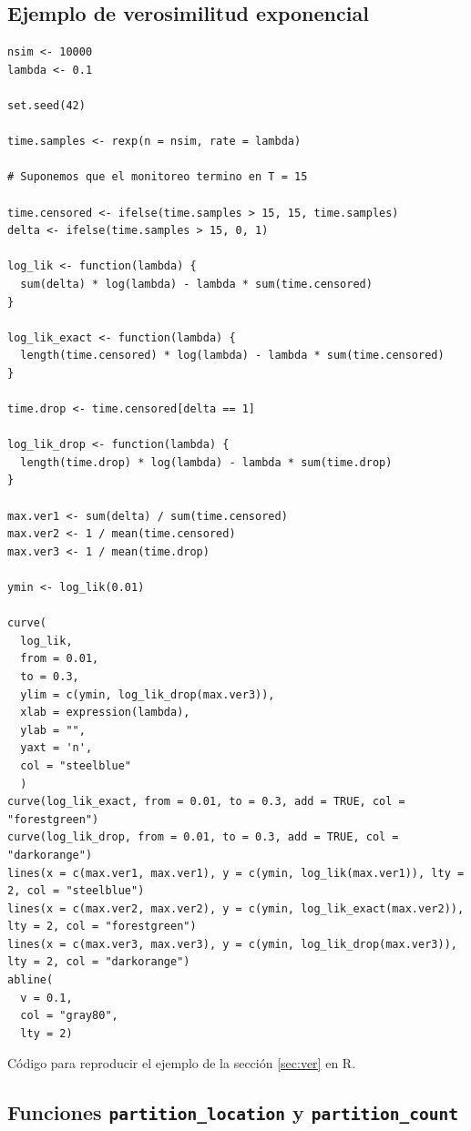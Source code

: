 \documentclass[11pt,a4paper]{article}
\begin{document}
\begin{appendices}
\subsection{Ejemplo de verosimilitud exponencial}
\label{ap:lik}

\begin{table}[!htb]
\begin{lstlisting}
nsim <- 10000
lambda <- 0.1

set.seed(42)

time.samples <- rexp(n = nsim, rate = lambda)

# Suponemos que el monitoreo termino en T = 15

time.censored <- ifelse(time.samples > 15, 15, time.samples)
delta <- ifelse(time.samples > 15, 0, 1)

log_lik <- function(lambda) {
  sum(delta) * log(lambda) - lambda * sum(time.censored)
}

log_lik_exact <- function(lambda) {
  length(time.censored) * log(lambda) - lambda * sum(time.censored)
}

time.drop <- time.censored[delta == 1]

log_lik_drop <- function(lambda) {
  length(time.drop) * log(lambda) - lambda * sum(time.drop)
}

max.ver1 <- sum(delta) / sum(time.censored)
max.ver2 <- 1 / mean(time.censored)
max.ver3 <- 1 / mean(time.drop)

ymin <- log_lik(0.01)

curve(
  log_lik,
  from = 0.01,
  to = 0.3,
  ylim = c(ymin, log_lik_drop(max.ver3)),
  xlab = expression(lambda),
  ylab = "",
  yaxt = 'n',
  col = "steelblue"
  )
curve(log_lik_exact, from = 0.01, to = 0.3, add = TRUE, col = "forestgreen")
curve(log_lik_drop, from = 0.01, to = 0.3, add = TRUE, col = "darkorange")
lines(x = c(max.ver1, max.ver1), y = c(ymin, log_lik(max.ver1)), lty = 2, col = "steelblue")
lines(x = c(max.ver2, max.ver2), y = c(ymin, log_lik_exact(max.ver2)), lty = 2, col = "forestgreen")
lines(x = c(max.ver3, max.ver3), y = c(ymin, log_lik_drop(max.ver3)), lty = 2, col = "darkorange")
abline(
  v = 0.1,
  col = "gray80",
  lty = 2)
\end{lstlisting}
\caption{Código para reproducir el ejemplo de la sección \ref{sec:ver} en R.}
\end{table}

\newpage
\clearpage

\subsection{Funciones \texttt{partition\_location} y \texttt{partition\_count}}
\label{ap:partition_functions}


\end{appendices}
\end{document}
